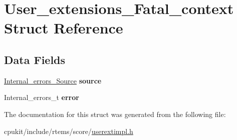 \hypertarget{structUser__extensions__Fatal__context}{}\section{User\+\_\+extensions\+\_\+\+Fatal\+\_\+context Struct Reference}
\label{structUser__extensions__Fatal__context}
\subsection*{Data Fields}
\begin{DoxyCompactItemize}
\item 
\mbox{\label{structUser__extensions__Fatal__context_a178dd676c5a60aa3e182747aef5837a6}} 
\mbox{\hyperlink{group__RTEMSScoreIntErr_ga878b4de77df7d0b83d19609d4de42c26}{Internal\+\_\+errors\+\_\+\+Source}} {\bfseries source}
\item 
\mbox{\label{structUser__extensions__Fatal__context_a02553102bb6cc2c83a6632401f8cc1f7}} 
Internal\+\_\+errors\+\_\+t {\bfseries error}
\end{DoxyCompactItemize}


The documentation for this struct was generated from the following file\+:\begin{DoxyCompactItemize}
\item 
cpukit/include/rtems/score/\mbox{\hyperlink{userextimpl_8h}{userextimpl.\+h}}\end{DoxyCompactItemize}
